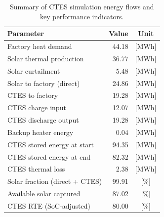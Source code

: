 \renewcommand{\arraystretch}{1.2}
\begin{table}[h]
\centering
\begin{tabular}{l|r c}
\hline
Parameter & Value & Unit \\
\hline
Factory heat demand & 44.18 & [MWh] \\
Solar thermal production & 36.77 & [MWh] \\
Solar curtailment & 5.48 & [MWh] \\
Solar to factory (direct) & 24.86 & [MWh] \\
CTES to factory & 19.28 & [MWh] \\
CTES charge input & 12.07 & [MWh] \\
CTES discharge output & 19.28 & [MWh] \\
Backup heater energy & 0.04 & [MWh] \\
CTES stored energy at start & 94.35 & [MWh] \\
CTES stored energy at end & 82.32 & [MWh] \\
CTES thermal loss & 2.38 & [MWh] \\
\hline
Solar fraction (direct + CTES) & 99.91 & [\%] \\
Available solar captured & 87.02 & [\%] \\
CTES RTE (SoC-adjusted) & 80.00 & [\%] \\
\hline
\end{tabular}
\caption{Summary of CTES simulation energy flows and key performance indicators.}
\label{tab:ctes-simulation-summary}
\end{table}

